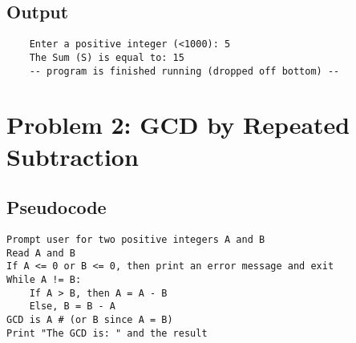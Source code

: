 \documentclass[a4paper]{article}
\begin{document}
\subsection*{Output}
\begin{verbatim}
    Enter a positive integer (<1000): 5
    The Sum (S) is equal to: 15
    -- program is finished running (dropped off bottom) --
\end{verbatim}

\newpage
\section*{Problem 2: GCD by Repeated Subtraction}
\subsection*{Pseudocode}
\begin{verbatim}
Prompt user for two positive integers A and B
Read A and B
If A <= 0 or B <= 0, then print an error message and exit
While A != B:
    If A > B, then A = A - B
    Else, B = B - A
GCD is A # (or B since A = B)
Print "The GCD is: " and the result
\end{verbatim}
\end{document}
